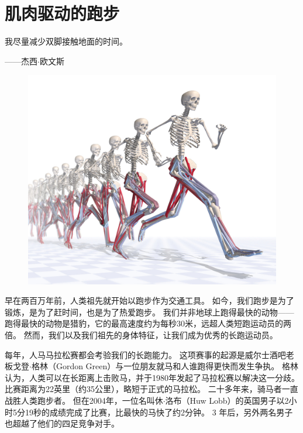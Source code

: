\chapter{肌肉驱动的跑步} \label{chap:chap12}


我尽量减少双脚接触地面的时间。
\begin{flushright}
	——杰西$\cdot$欧文斯
\end{flushright}

\begin{figure}[!htb]
	\centering
	\includegraphics[width=1.0\linewidth]{chap12/12_0}
	\caption*{ \label{fig:12_0}}
\end{figure}


早在两百万年前，人类祖先就开始以跑步作为交通工具。
如今，我们跑步是为了锻炼，是为了赶时间，也是为了热爱跑步。
我们并非地球上跑得最快的动物——跑得最快的动物是猎豹，它的最高速度约为每秒30米，远超人类短跑运动员的两倍。
然而，我们以及我们祖先的身体特征，让我们成为优秀的长跑运动员。


每年，人马马拉松赛都会考验我们的长跑能力。
这项赛事的起源是威尔士酒吧老板戈登$\cdot$格林（Gordon Green）与一位朋友就马和人谁跑得更快而发生争执。
格林认为，人类可以在长距离上击败马，并于1980年发起了马拉松赛以解决这一分歧。
比赛距离为22英里（约35公里），略短于正式的马拉松。
二十多年来，骑马者一直战胜人类跑步者。
但在2004年，一位名叫休$\cdot$洛布（Huw Lobb）的英国男子以2小时5分19秒的成绩完成了比赛，比最快的马快了约2分钟。
3 年后，另外两名男子也超越了他们的四足竞争对手。


